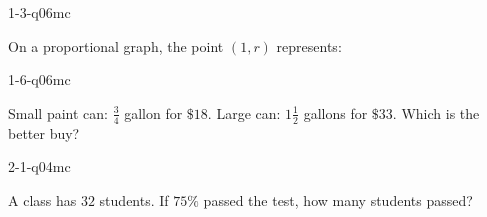 \documentclass[12pt, fleqn, openany]{studyGuide}
\begin{document}
\renewcommand{\VMBookTitle}{5 Full-Length Texas STAAR Grade 7 Math Practice Tests}
\renewcommand{\VMBookSubtitle}{Extra Practice for Test Day Success}
\renewcommand{\VMFooterURL}{https://viewmath.com/grade7}
\renewcommand{\VMFooterURLDisplay}{ViewMath.com/Grade7}






\tableofcontents
\cleardoublepage
{}


\begin{practiceQuestion}{1-3-q06}{mc}
\begin{questionText}
On a proportional graph, the point $(1, r)$ represents:
\end{questionText}
\end{practiceQuestion}

\begin{practiceQuestion}{1-6-q06}{mc}
\begin{questionText}
Small paint can: $\frac{3}{4}$ gallon for $\$18$. Large can: $1\frac{1}{2}$ gallons for $\$33$. Which is the better buy?
\end{questionText}
\end{practiceQuestion}

\begin{practiceQuestion}{2-1-q04}{mc}
\begin{questionText}
A class has $32$ students. If $75\%$ passed the test, how many students passed?
\end{questionText}
\end{practiceQuestion}
\end{document}
